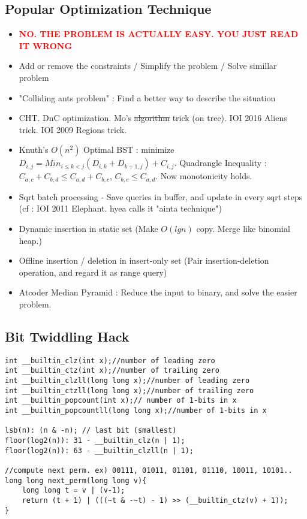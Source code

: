 \documentclass[landscape, 8pt, a4paper, oneside,  twocolumn]{extarticle}
\begin{document}
\subsection {Popular Optimization Technique}
\begin{itemize}
	
	\item \textcolor{red}{\textbf{NO. THE PROBLEM IS ACTUALLY EASY. YOU JUST READ IT WRONG}}
	\item Add or remove the constraints / Simplify the problem / Solve simillar problem
	\item "Colliding ants problem" : Find a better way to describe the situation
	\item CHT. DnC optimization. Mo's \sout{algorithm} trick (on tree). IOI 2016 Aliens trick. IOI 2009 Regions trick.
	\item Knuth's $O(n^2)$ Optimal BST : minimize $D_{i, j} = Min_{i \leq k < j}(D_{i, k} + D_{k+1, j}) + C_{i, j}$. Quadrangle Inequality : $C_{a, c} + C_{b, d} \leq C_{a, d} + C_{b, c}$, $C_{b, c} \leq C_{a, d}$. Now monotonicity holds. 
	\item Sqrt batch processing - Save queries in buffer, and update in every sqrt steps (cf : IOI 2011 Elephant. hyea calls it "ainta technique")
	\item Dynamic insertion in static set (Make $O(lgn)$ copy. Merge like binomial heap.)
	\item Offline insertion / deletion in insert-only set (Pair insertion-deletion operation, and regard it as range query)
	\item Atcoder Median Pyramid : Reduce the input to binary, and solve the easier problem.
\end{itemize}

\subsection {Bit Twiddling Hack}
\begin{verbatim}
int __builtin_clz(int x);//number of leading zero
int __builtin_ctz(int x);//number of trailing zero
int __builtin_clzll(long long x);//number of leading zero
int __builtin_ctzll(long long x);//number of trailing zero
int __builtin_popcount(int x);// number of 1-bits in x
int __builtin_popcountll(long long x);//number of 1-bits in x

lsb(n): (n & -n); // last bit (smallest)
floor(log2(n)): 31 - __builtin_clz(n | 1); 
floor(log2(n)): 63 - __builtin_clzll(n | 1);

//compute next perm. ex) 00111, 01011, 01101, 01110, 10011, 10101..
long long next_perm(long long v){
	long long t = v | (v-1);
	return (t + 1) | (((~t & -~t) - 1) >> (__builtin_ctz(v) + 1));
}
\end{verbatim}
\end{document}
